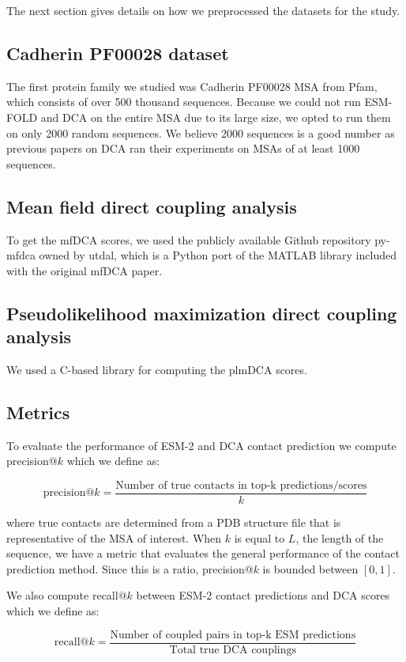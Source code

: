 \documentclass{article}
\begin{document}
The next section gives details on how we preprocessed the datasets for the study.

\subsection{Cadherin PF00028 dataset}
The first protein family we studied was Cadherin PF00028 MSA from Pfam, which consists of over 500 thousand sequences. Because we could not run ESM-FOLD and DCA on the entire MSA due to its large size, we opted to run them on only 2000 random sequences. We believe 2000 sequences is a good number as previous papers on DCA ran their experiments on MSAs of at least 1000 sequences. 

\subsection{Mean field direct coupling analysis}
To get the mfDCA scores, we used the publicly available Github repository py-mfdca owned by utdal, which is a Python port of the MATLAB library included with the original mfDCA paper. 

\subsection{Pseudolikelihood maximization direct coupling analysis}
We used a C-based library for computing the plmDCA scores.  

\subsection{Metrics}
To evaluate the performance of ESM-2 and DCA contact prediction we compute precision@$k$ which we define as:

$$\text{precision@}k = \frac{\text{Number of true contacts in top-k predictions/scores}}{k} $$

\noindent where true contacts are determined from a PDB structure file that is representative of the MSA of interest. When $k$ is equal to $L$, the length of the sequence, we have a metric that evaluates the general performance of the contact prediction method. Since this is a ratio, precision@$k$ is bounded between $\left[0,1\right]$.

We also compute recall@$k$ between ESM-2 contact predictions and DCA scores which we define as:

$$\text{recall@}k = \frac{\text{Number of coupled pairs in top-k ESM predictions}}{\text{Total true DCA couplings}} $$
\end{document}
